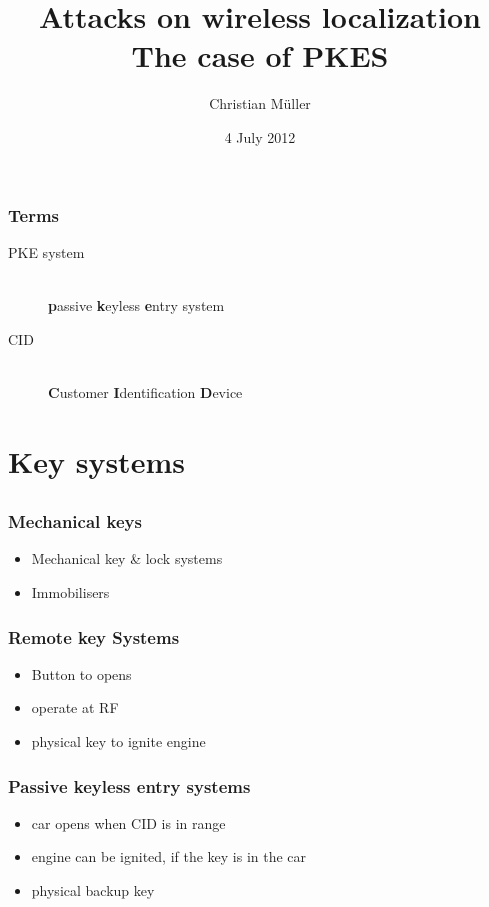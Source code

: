 \documentclass[12pt]{beamer}
\title{Attacks on wireless localization\\ The case of PKES}
\author{Christian Müller}
\date{4 July 2012}
\begin{document}
	\begin{frame}
		\titlepage
	\end{frame}

	\begin{frame}
		\frametitle{Terms}
			\begin{description}
				\item[PKE system]\hfill \\
						\textbf{p}assive \textbf{k}eyless \textbf{e}ntry system
				\item[CID] \hfill \\
					\textbf{C}ustomer \textbf{I}dentification \textbf{D}evice
			\end{description}
	\end{frame}

	\begin{frame}
		\tableofcontents
	\end{frame}
	
\section{Key systems}
\subsection*{}
	\begin{frame}
		\frametitle{Mechanical keys}
		\begin{itemize}
			\item Mechanical key \& lock systems
			\item Immobilisers
		\end{itemize}
	\end{frame}
	
	\begin{frame}
		\frametitle{Remote key Systems}
		\begin{itemize}
			\item Button to opens
			\item operate at RF 	%
			\item physical key to ignite engine
		\end{itemize}
	\end{frame}

	\begin{frame}
		\frametitle{Passive keyless entry systems}
		\begin{itemize}
			\item car opens when CID is in range
			\item engine can be ignited, if the key is in the car
			\item physical backup key
		\end{itemize}
	\end{frame}
\end{document}
